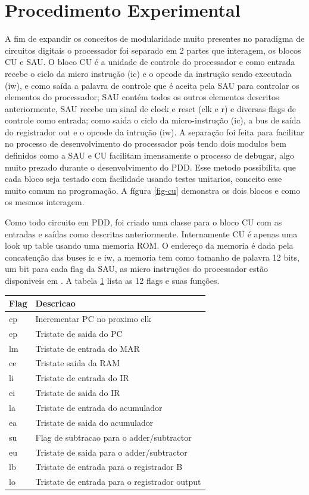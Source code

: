 \documentclass[11pt, twocolumn]{article}
\begin{document}
\section{Procedimento Experimental}
  
A fim de expandir os conceitos de modularidade muito presentes no paradigma de circuitos digitais o processador foi separado em 2 partes que interagem, os blocos CU e SAU. O bloco CU é a unidade de controle do processador e como entrada recebe o ciclo da micro instrução (ic) e o opcode da instrução sendo executada (iw), e como saída a palavra de controle que é aceita pela SAU para controlar os elementos do processador; SAU contém todos os outros elementos descritos anteriormente, SAU recebe um sinal de clock e reset (clk e r) e diversas flags de controle como entrada; como saida o ciclo da micro-instrução (ic), a bus de saída do registrador out e o opcode da intrução (iw). A separação foi feita para facilitar no processo de desenvolvimento do processador pois tendo dois modulos bem definidos como a SAU e CU facilitam imensamente o processo de debugar, algo muito prezado durante o desenvolvimento do PDD. Esse metodo possibilita que cada bloco seja testado com facilidade usando testes unitarios, conceito esse muito comum na programação. A fígura \ref{fig-cu} demonstra os dois blocos e como os mesmos interagem.

Como todo circuito em PDD, foi criado uma classe para o bloco CU com as entradas e saídas como descritas anteriormente. Internamente CU é apenas uma look up table usando uma memoria ROM. O endereço da memoria é dada pela concatenção das buses ic e iw, a memoria tem como tamanho de palavra 12 bits, um bit para cada flag da SAU, as micro instruções do processador estão disponiveis em \cite{malv}. A tabela \ref{tab-flags} lista as 12 flags e suas funções. 

\begin{table}
\begin{tabular}{ll}
\hline
Flag & Descricao \\
\hline
cp & Incrementar PC no proximo clk \\
ep & Tristate de saida do PC \\
lm & Tristate de entrada do MAR \\
ce & Tristate saida da RAM \\
li & Tristate de entrada do IR \\
ei & Tristate de saida do IR \\
la & Tristate de entrada do acumulador \\
ea & Tristate de saida do acumulador \\
su & Flag de subtracao para o adder/subtractor \\
eu & Tristate de saida para o adder/subtractor \\
lb & Tristate de entrada para o registrador B \\
lo & Tristate de entrada para o registrador output \\
\hline
\end{tabular}
\label{tab-flags}
\end{table}
\end{document}
